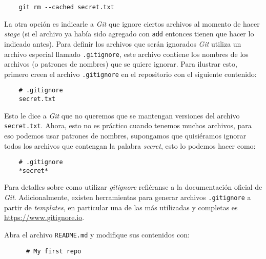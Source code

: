  \begin{verbatim}
    git rm --cached secret.txt
  \end{verbatim}

  La otra opción es indicarle a \textit{Git} que ignore ciertos archivos al momento de hacer 
  \textit{stage} (si el archivo ya había sido agregado con \texttt{add} entonces tienen que hacer lo
  indicado antes).
  Para definir los archivos que serán ignorados \textit{Git} utiliza un archivo especial llamado 
  \texttt{.gitignore}, este archivo contiene los nombres de los archivos (o patrones de nombres) que
  se quiere ignorar.
  Para ilustrar esto, primero creen el archivo \texttt{.gitignore} en el repositorio con el 
  siguiente contenido:

  \begin{verbatim}
    # .gitignore
    secret.txt
  \end{verbatim}

  Esto le dice a \textit{Git} que no queremos que se mantengan versiones del archivo 
  \texttt{secret.txt}.
  Ahora, esto no es práctico cuando tenemos muchos archivos, para eso podemos usar patrones de 
  nombres, supongamos que quisiéramos ignorar todos los archivos que contengan la palabra 
  \textit{secret}, esto lo podemos hacer como:

  \begin{verbatim}
    # .gitignore
    *secret*
  \end{verbatim}

  Para detalles sobre como utilizar \textit{gitignore} refiéranse a la documentación oficial de 
  \textit{Git}\autocite{gitignore}.
  Adicionalmente, existen herramientas para generar archivos \texttt{.gitignore} a partir de 
  \textit{templates}, en particular una de las más utilizadas y completas es 
  \url{https://www.gitignore.io}.

  \begin{exercise}
    Abra el archivo \texttt{README.md} y modifique sus contenidos con:

    \begin{verbatim}
      # My first repo
    \end{verbatim}
  \end{exercise}
%